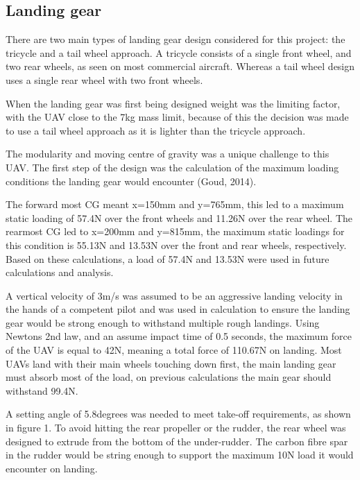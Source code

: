 \documentclass[../../main.tex]{subfiles}
\begin{document}
\subsection{Landing gear} \label{sec:design-process:final-design-proposal:landing-gear}

There are two main types of landing gear design considered for this project: the tricycle and a tail wheel approach. A tricycle consists of a single front wheel, and two rear wheels, as seen on most commercial aircraft.
Whereas a tail wheel design uses a single rear wheel with two front wheels.


When the landing gear was first being designed  weight was the limiting factor, with the UAV close to the 7kg mass limit, because of this the decision was made to use a tail wheel approach as it is lighter than the tricycle approach.

The modularity and moving centre of gravity was a unique challenge to this UAV.
The first step of the design was the calculation of the maximum loading conditions the landing gear would encounter (Goud, 2014). 


The forward most CG meant x=150mm and y=765mm, this led to a maximum static loading of 57.4N over the front wheels and 11.26N over the rear wheel.
The rearmost CG led to x=200mm and y=815mm, the maximum static loadings for this condition is 55.13N and 13.53N over the front and rear wheels, respectively.
Based on these calculations, a load of 57.4N and 13.53N were used in future calculations and analysis. 

A vertical velocity of 3m/s was assumed to be an aggressive landing velocity in the hands of a competent pilot and was used in calculation to ensure the landing gear would be strong enough to withstand multiple rough landings.
Using Newtons 2nd law, and an assume impact time of 0.5 seconds, the maximum force of the UAV is equal to 42N, meaning a total force of 110.67N on landing.
Most UAVs land with their main wheels touching down first, the main landing gear must absorb most of the load, on previous calculations the main gear should withstand 99.4N.  


A setting angle of 5.8degrees was needed to meet take-off requirements, as shown in figure 1.
To avoid hitting the rear propeller or the rudder, the rear wheel was designed to extrude from the bottom of the under-rudder.
The carbon fibre spar in the rudder would be string enough to support the maximum 10N load it would encounter on landing. 
\end{document}
